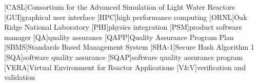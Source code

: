 \begin{acronym}
[CASL]{Consortium for the Advanced Simulation of Light Water Reactors}
[GUI]{graphical user interface}
[HPC]{high performance computing}
[ORNL]{Oak Ridge National Laboratory}
[PHI]{physics integration}
[PSM]{product software manager}
[QA]{quality assurance}
[QAPP]{Quality Assurance Program Plan}
[SBMS]{Standards Based Management System}
[SHA-1]{Secure Hash Algorithm 1}
[SQA]{software quality assurance}
[SQAP]{software quality assurance program}
[VERA]{Virtual Environment for Reactor Applications}
[V\&V]{verification and validation}
\end{acronym}

